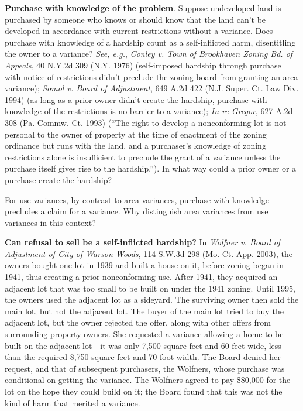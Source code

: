 \item
\textbf{Purchase with knowledge of the problem}. Suppose undeveloped land is
purchased by someone who knows or should know that the land can't be developed
in accordance with current restrictions without a variance. Does purchase with
knowledge of a hardship count as a self-inflicted harm, disentitling the owner
to a variance? \emph{See, e.g.}, \emph{Conley v. Town of Brookhaven Zoning Bd.
of Appeals}, 40 N.Y.2d 309 (N.Y. 1976) (self-imposed hardship through purchase
with notice of restrictions didn't preclude the zoning board from granting an
area variance); \emph{Somol v. Board of Adjustment}, 649 A.2d 422 (N.J. Super.
Ct. Law Div. 1994) (as long as a prior owner didn't create the hardship,
purchase with knowledge of the restrictions is no barrier to a variance);
\emph{In re Gregor}, 627 A.2d 308 (Pa. Commw. Ct. 1993) (``The right to develop
a nonconforming lot is not personal to the owner of property at the time of
enactment of the zoning ordinance but runs with the land, and a purchaser's
knowledge of zoning restrictions alone is insufficient to preclude the grant of
a variance unless the purchase itself gives rise to the hardship.''). In what
way could a prior owner or a purchase create the hardship? 

For use variances, by contrast to area variances, purchase with knowledge
precludes a claim for a variance. Why distinguish area variances from use
variances in this context? 

\item
\textbf{Can refusal to sell be a self-inflicted hardship?} In \textit{Wolfner v.
Board of Adjustment of City of Warson Woods}, 114 S.W.3d 298 (Mo. Ct. App.
2003), the owners bought one lot in 1939 and built a house on it, before zoning
began in 1941, thus creating a prior nonconforming use. After 1941, they
acquired an adjacent lot that was too small to be built on under the 1941
zoning. Until 1995, the owners used the adjacent lot as a sideyard. The
surviving owner then sold the main lot, but not the adjacent lot. The buyer of
the main lot tried to buy the adjacent lot, but the owner rejected the offer,
along with other offers from surrounding property owners. She requested a
variance allowing a home to be built on the adjacent lot---it was only 7,500
square feet and 60 feet wide, less than the required 8,750 square feet and
70-foot width. The Board denied her request, and that of subsequent purchasers,
the Wolfners, whose purchase was conditional on getting the variance. The
Wolfners agreed to pay \$80,000 for the lot on the hope they could build on it;
the Board found that this was not the kind of harm that merited a variance.


